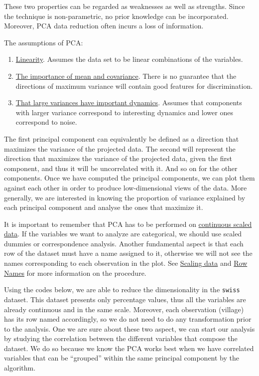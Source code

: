 \documentclass[
]{svmono}
\providecommand{\tightlist}{%
  \setlength{\itemsep}{0pt}\setlength{\parskip}{0pt}}
\begin{document}
These two properties can be regarded as weaknesses as well as strengths.
Since the technique is non-parametric, no prior knowledge can be
incorporated. Moreover, PCA data reduction often incurs a loss of
information.

The assumptions of PCA:

\begin{enumerate}
\def\labelenumi{\arabic{enumi}.}
\tightlist
\item
  \ul{Linearity}. Assumes the data set to be linear
  combinations of the variables.
\item
  \ul{The importance of mean and covariance}. There is no
  guarantee that the directions of maximum variance will contain good
  features for discrimination.
\item
  \ul{That large variances have important dynamics}. Assumes
  that components with larger variance correspond to interesting
  dynamics and lower ones correspond to noise.
\end{enumerate}

The first principal component can equivalently be defined as a direction
that maximizes the variance of the projected data. The second will
represent the direction that maximizes the variance of the projected
data, given the first component, and thus it will be uncorrelated with
it. And so on for the other components. Once we have computed the
principal components, we can plot them against each other in order to
produce low-dimensional views of the data. More generally, we are
interested in knowing the proportion of variance explained by each
principal component and analyse the ones that maximize it.

It is important to remember that PCA has to be performed on \ul{continuous
scaled data}. If the variables we want to analyze are
categorical, we should use scaled dummies or correspondence analysis.
Another fundamental aspect is that each row of the dataset must have a
name assigned to it, otherwise we will not see the names corresponding
to each observation in the plot. See \protect\hyperlink{scaling-data}{Scaling data} and \protect\hyperlink{row-names}{Row Names} for
more information on the procedure.

Using the codes below, we are able to reduce the dimensionality in the
\texttt{swiss} dataset. This dataset presents only percentage values, thus all
the variables are already continuous and in the same scale. Moreover,
each observation (village) has its row named accordingly, so we do not
need to do any transformation prior to the analysis. One we are sure
about these two aspect, we can start our analysis by studying the
correlation between the different variables that compose the dataset. We
do so because we know the PCA works best when we have correlated
variables that can be ``grouped'' within the same principal component by
the algorithm.
\end{document}
